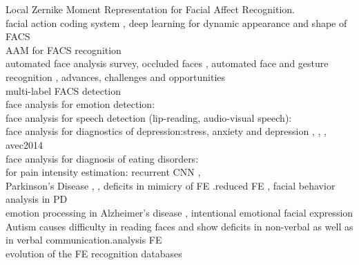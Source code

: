 Local Zernike Moment Representation for Facial Affect Recognition. \cite{Sariyanidi2013}\\

facial action coding system \cite{Ekman1977}\cite{Ekman1997}, deep learning for dynamic appearance and shape of FACS \cite{Jaiswal2016}\\

AAM for FACS recognition \cite{Lucey2007}\\


automated face analysis \cite{Cohn2014}survey\cite{Fasel2003}, occluded faces \cite{Cotter2010}, automated face and gesture recognition \cite{de2015intraface}, advances, challenges and opportunities \cite{Martinez2016}\\

multi-label FACS detection \cite{Chu2016}\\


face analysis for emotion detection:
\cite{Huang2010}\\


face analysis for speech detection (lip-reading, audio-visual speech):\\


face analysis for diagnostics of depression:stress, anxiety and depression \cite{Holt2016}, \cite{Valstar2014automatic}, \cite{Valstar2016avec}, avec2014\cite{Valstar2014avec}\\


face analysis for diagnosis of eating disorders:\cite{Leppanen2017}\\


for pain intensity estimation: recurrent CNN \cite{Zhou2016}, \cite{Valstar2014automatic}\\


Parkinson's Disease \cite{Almutiry2016}, \cite{Bandini2017}, deficits in mimicry of FE \cite{Livingstone2016}.reduced FE \cite{Ricciardi2015}, facial behavior analysis in PD \cite{Silverdale2016}\\

emotion processing in Alzheimer's disease \cite{Cadieux1997}, intentional emotional facial expression \cite{Gola2017}\\


Autism causes difficulty in reading faces and show deficits in non-verbal as well as in verbal communication.analysis FE \cite{Valstar2014automatic}\\



evolution of the FE recognition databases \cite{Roychowdhury2015survey}\\



